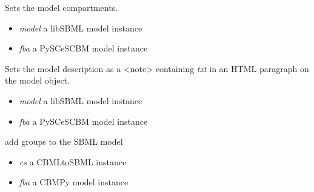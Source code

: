 \documentclass[a4paper,11pt,english]{sphinxmanual}
\begin{document}
\begin{fulllineitems}
\label{modules_doc:cbmpy.CBXML.sbml_setCompartmentsL3}
Sets the model compartments.
\begin{itemize}
\item {} 
\emph{model} a libSBML model instance

\item {} 
\emph{fba} a PySCeSCBM model instance

\end{itemize}

\end{fulllineitems}


\begin{fulllineitems}
\label{modules_doc:cbmpy.CBXML.sbml_setDescription}
Sets the model description as a \textless{}note\textgreater{} containing \emph{txt} in an HTML paragraph on the model object.
\begin{itemize}
\item {} 
\emph{model} a libSBML model instance

\item {} 
\emph{fba} a PySCeSCBM model instance

\end{itemize}

\end{fulllineitems}


\begin{fulllineitems}
\label{modules_doc:cbmpy.CBXML.sbml_setGroupsL3}
add groups to the SBML model
\begin{itemize}
\item {} 
\emph{cs} a CBMLtoSBML instance

\item {} 
\emph{fba} a CBMPy model instance

\end{itemize}

\end{fulllineitems}

\end{document}

